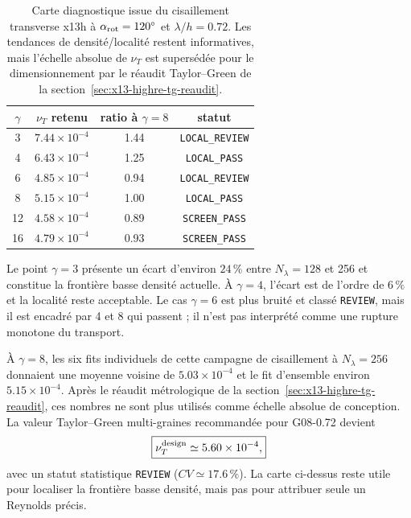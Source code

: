 \documentclass[11pt,a4paper]{article}
\begin{document}
\begin{table}[htbp]
\centering
\small
\caption{Carte diagnostique issue du cisaillement transverse x13h à $\alpha_{\rm rot}=120^\circ$ et $\lambda/h=0.72$. Les tendances de densité/localité restent informatives, mais l'échelle absolue de $\nu_T$ est supersédée pour le dimensionnement par le réaudit Taylor--Green de la section~\ref{sec:x13-highre-tg-reaudit}.}
\label{tab:x13-density-map}
\begin{tabular}{cccc}
\toprule
$\gamma$ & $\nu_T$ retenu & ratio à $\gamma=8$ & statut \\
\midrule
3  & $7.44\times10^{-4}$ & 1.44 & \texttt{LOCAL\_REVIEW} \\
4  & $6.43\times10^{-4}$ & 1.25 & \texttt{LOCAL\_PASS} \\
6  & $4.85\times10^{-4}$ & 0.94 & \texttt{LOCAL\_REVIEW} \\
8  & $5.15\times10^{-4}$ & 1.00 & \texttt{LOCAL\_PASS} \\
12 & $4.58\times10^{-4}$ & 0.89 & \texttt{SCREEN\_PASS} \\
16 & $4.79\times10^{-4}$ & 0.93 & \texttt{SCREEN\_PASS} \\
\bottomrule
\end{tabular}
\end{table}

Le point $\gamma=3$ présente un écart d'environ $24\,\%$ entre $N_\lambda=128$ et 256 et constitue la frontière basse densité actuelle. À $\gamma=4$, l'écart est de l'ordre de $6\,\%$ et la localité reste acceptable. Le cas $\gamma=6$ est plus bruité et classé \texttt{REVIEW}, mais il est encadré par 4 et 8 qui passent ; il n'est pas interprété comme une rupture monotone du transport.

À $\gamma=8$, les six fits individuels de cette campagne de cisaillement à $N_\lambda=256$ donnaient une moyenne voisine de $5.03\times10^{-4}$ et le fit d'ensemble environ $5.15\times10^{-4}$. Après le réaudit métrologique de la section~\ref{sec:x13-highre-tg-reaudit}, ces nombres ne sont plus utilisés comme échelle absolue de conception. La valeur Taylor--Green multi-graines recommandée pour G08-0.72 devient
\begin{equation}
  \boxed{
  \nu_T^{\rm design}
  \simeq
  5.60\times10^{-4},
  }
  \label{eq:x13-final-nuT}
\end{equation}
avec un statut statistique \texttt{REVIEW} ($CV\simeq17.6\,\%$). La carte ci-dessus reste utile pour localiser la frontière basse densité, mais pas pour attribuer seule un Reynolds précis.
\end{document}

